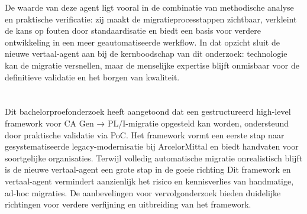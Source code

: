 De waarde van deze agent ligt vooral in de combinatie van methodische analyse en praktische verificatie: zij maakt de migratieprocesstappen 
zichtbaar, verkleint de kans op fouten door standaardisatie en biedt een basis voor verdere ontwikkeling in een meer geautomatiseerde 
werkflow. In dat opzicht sluit de nieuwe vertaal-agent aan bij de kernboodschap van dit onderzoek: technologie kan de migratie versnellen, 
maar de menselijke expertise blijft onmisbaar voor de definitieve validatie en het borgen van kwaliteit.

\section*{}%
\label{sec:slotwoord}

Dit bachelorproefonderzoek heeft aangetoond dat een gestructureerd high-level framework voor CA Gen → PL/I-migratie 
opgesteld kan worden, ondersteund door praktische validatie via PoC. Het framework vormt een eerste stap naar 
gesystematiseerde legacy-modernisatie bij ArcelorMittal en biedt handvaten voor soortgelijke organisaties. 
Terwijl volledig automatische migratie onrealistisch blijft is de nieuwe vertaal-agent een grote stap in de goeie richting
Dit framework en vertaal-agent vermindert aanzienlijk het risico en 
kennisverlies van handmatige, ad-hoc migraties. De aanbevelingen voor vervolgonderzoek bieden duidelijke richtingen 
voor verdere verfijning en uitbreiding van het framework.



